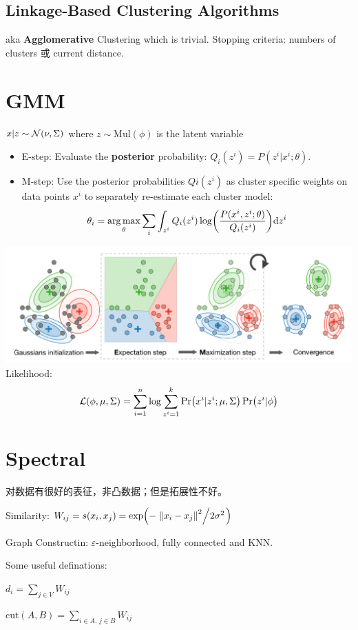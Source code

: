 \documentclass[a4paper,landscape]{article}
\begin{document}
\begin{tiny}
\begin{multicols}{4}
		\subsection{Linkage-Based Clustering Algorithms} aka \textbf{Agglomerative} Clustering which is trivial. Stopping criteria: numbers of clusters 或 current distance.

		\section{GMM} $x|z\sim\mathcal{N}(\nu,\Sigma)$ where  $z\sim \mathrm{Mul}(\phi)$ is the latent variable
		\begin{itemize}
			\item
			      E-step: Evaluate the \textbf{posterior} probability:
			      $Q_i(z^i)=P(z^i|x^i;\theta)$.
			\item
			      M-step: Use the posterior probabilities $Qi(z^i)$ as cluster specific weights on data points $x^i$ to separately re-estimate each cluster model:
			      \[
				      \theta_i
				      =
				      \mathop{\arg\max}_\theta \sum_i \int_{z^i}
				      Q_i(z^i)\log(\frac{P(x^i,z^i;\theta)}{Q_i(z^i)}) \dd z^i
			      \]
		\end{itemize}
		\includegraphics[width=\linewidth]{EM.png}
		Likelihood:
		\[\mathcal{L}(\phi,\mu,\Sigma)=\sum_{i=1}^n\log\sum_{z^i=1}^k\Pr(x^i|z^i;\mu,\Sigma)\Pr(z^i|\phi)\]

		\section{Spectral}
		对数据有很好的表征，非凸数据；但是拓展性不好。

		Similarity: $W_{ij}=s(x_i,x_j)=\exp(-\flatfrac{\norm{x_i-x_j}^2}{2\sigma^2})$

		Graph Constructin: $\varepsilon$-neighborhood, fully connected and KNN.
		\begin{defi}
			Some useful definations:

			$d_i=\sum_{j\in V}W_{ij}$

			$\mathrm{cut}(A,B)=\sum_{i\in A,\,j\in B}W_{ij}$


\end{defi}
\end{multicols}
\end{tiny}
\end{document}
